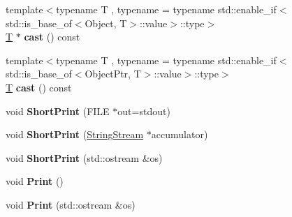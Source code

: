 \begin{DoxyCompactItemize}
{\footnotesize template$<$typename T , typename  = typename std\+::enable\+\_\+if$<$                            std\+::is\+\_\+base\+\_\+of$<$\+Object, T$>$\+::value$>$\+::type$>$ }\\\mbox{\hyperlink{classv8_1_1internal_1_1torque_1_1T}{T}} $\ast$ {\bfseries cast} () const
\item 
\mbox{\label{classv8_1_1internal_1_1MaybeObject_a68ac195cef3dbaf136544216650b95b7}} 
{\footnotesize template$<$typename T , typename  = typename std\+::enable\+\_\+if$<$                            std\+::is\+\_\+base\+\_\+of$<$\+Object\+Ptr, T$>$\+::value$>$\+::type$>$ }\\\mbox{\hyperlink{classv8_1_1internal_1_1torque_1_1T}{T}} {\bfseries cast} () const
\item 
\mbox{\label{classv8_1_1internal_1_1MaybeObject_a34a1313e4a2edc54b6e54184fe5fcf1f}} 
void {\bfseries Short\+Print} (F\+I\+LE $\ast$out=stdout)
\item 
\mbox{\label{classv8_1_1internal_1_1MaybeObject_aefb51e2f8a90fe6096dcd7b0d14e4a65}} 
void {\bfseries Short\+Print} (\mbox{\hyperlink{classv8_1_1internal_1_1StringStream}{String\+Stream}} $\ast$accumulator)
\item 
\mbox{\label{classv8_1_1internal_1_1MaybeObject_a929bb4b9b5520e01bc4fc5d10c0f7323}} 
void {\bfseries Short\+Print} (std\+::ostream \&os)
\item 
\mbox{\label{classv8_1_1internal_1_1MaybeObject_aa87637eaa8227fa8c041e989eda0a73f}} 
void {\bfseries Print} ()
\item 
\mbox{\label{classv8_1_1internal_1_1MaybeObject_a29057bb104b7be01234470e7e23e393f}} 
void {\bfseries Print} (std\+::ostream \&os)
\end{DoxyCompactItemize}
